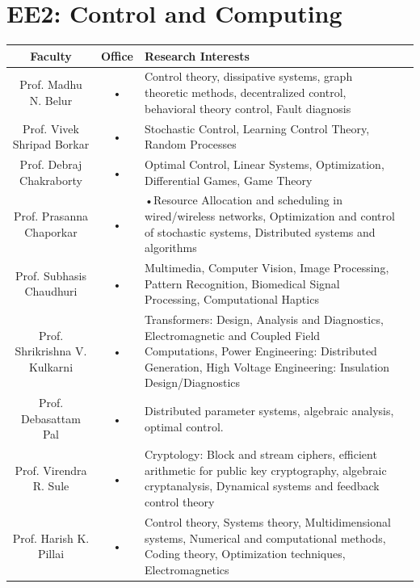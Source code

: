 \documentclass[11pt,fleqn,openany]{book} %
\begin{document}
\section{EE2: Control and Computing}
\begin{tabular}{|c|c|p{6cm}|c}
\hline 
Faculty  & Office  & Research Interests \\ 
\hline 
Prof. Madhu N. Belur & • & Control theory, dissipative systems, graph theoretic methods, decentralized control, behavioral theory control, Fault diagnosis \\ 
\hline 
Prof. Vivek Shripad Borkar & • & Stochastic Control, Learning Control Theory, Random Processes \\ 
\hline 
Prof. Debraj Chakraborty & • & Optimal Control, Linear Systems, Optimization, Differential Games,
Game Theory \\ 
\hline 
Prof. Prasanna Chaporkar & • & •Resource Allocation and scheduling in wired/wireless networks, Optimization and control of stochastic systems, Distributed systems and algorithms \\ 
\hline 
Prof. Subhasis Chaudhuri & • & Multimedia, Computer Vision, Image Processing, Pattern Recognition,
Biomedical Signal Processing, Computational Haptics \\ 
\hline 
Prof. Shrikrishna V. Kulkarni & • & Transformers: Design, Analysis and Diagnostics, Electromagnetic and Coupled Field Computations, Power Engineering: Distributed Generation, High Voltage Engineering: Insulation Design/Diagnostics \\ 
\hline 
Prof. Debasattam Pal & • & Distributed parameter systems, algebraic analysis, optimal control. \\ 
\hline 
Prof. Virendra R. Sule  & • & Cryptology: Block and stream ciphers, efficient arithmetic for public key cryptography, algebraic cryptanalysis, Dynamical systems and feedback control theory \\ 
\hline
Prof. Harish K. Pillai  & • & Control theory, Systems theory, Multidimensional systems, Numerical
and computational methods, Coding theory, Optimization techniques, Electromagnetics \\ 
\hline 
\end{tabular} 
\end{document}
